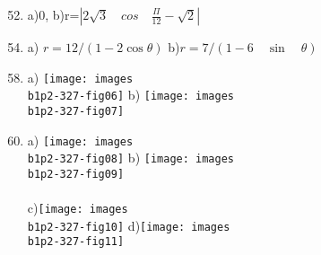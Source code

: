 \documentclass[11pt]{amsbook}
\begin{document}
    \begin{enumerate}
        \setcounter{enumi}{51}
        \item a)0, \hspace{3 cm} b)r=$\left|2 \sqrt{3} \quad cos \quad \frac{\Pi}{12} -\sqrt{2}\right|$
     \end{enumerate}
     
     \begin{enumerate}
        \setcounter{enumi}{53}
        \item a) $r = 12/(1- 2 \cos \theta)$ \quad b)$r = 7 /(1 - 6 \quad \sin \quad\theta)$
     \end{enumerate}
     
     \begin{enumerate}
        \setcounter{enumi}{57}
        \item a) \texttt{[image: images\\b1p2-327-fig06]} \quad b) \texttt{[image: images\\b1p2-327-fig07]}
     \end{enumerate}
     
     \begin{enumerate}
        \setcounter{enumi}{59}
        \item a) \texttt{[image: images\\b1p2-327-fig08]} \hspace{36 pt}  b) \texttt{[image: images\\b1p2-327-fig09]}\\\\
        c)\texttt{[image: images\\b1p2-327-fig10]}\hspace{16 pt}  d)\texttt{[image: images\\b1p2-327-fig11]}
     \end{enumerate}
     
     
     
 
\end{document}
